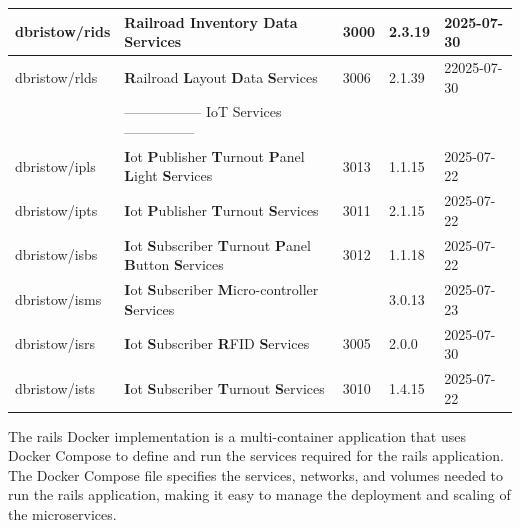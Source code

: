 \begin{longtable}{|L{3cm}|L{7cm}|L{1cm}|L{1.5cm}|L{2cm}|}
  dbristow/rids & \textbf{R}ailroad \textbf{I}nventory \textbf{D}ata \textbf{S}ervices  & 3000 & 2.3.19 & 2025-07-30 \\ \hline
  dbristow/rlds & \textbf{R}ailroad \textbf{L}ayout \textbf{D}ata \textbf{S}ervices  & 3006 & 2.1.39 & 22025-07-30 \\ \hline
  & ----------------- IoT Services --------------- &  &  & \\ \hline
  dbristow/ipls & \textbf{I}ot \textbf{P}ublisher \textbf{T}urnout \textbf{P}anel \textbf{L}ight \textbf{S}ervices & 3013 & 1.1.15 & 2025-07-22 \\ \hline
  dbristow/ipts & \textbf{I}ot \textbf{P}ublisher \textbf{T}urnout \textbf{S}ervices & 3011 & 2.1.15 & 2025-07-22 \\ \hline
  dbristow/isbs & \textbf{I}ot \textbf{S}ubscriber \textbf{T}urnout \textbf{P}anel \textbf{B}utton \textbf{S}ervices & 3012 & 1.1.18 & 2025-07-22 \\ \hline
  dbristow/isms & \textbf{I}ot \textbf{S}ubscriber \textbf{M}icro-controller \textbf{S}ervices &  & 3.0.13 & 2025-07-23 \\ \hline
  dbristow/isrs & \textbf{I}ot \textbf{S}ubscriber \textbf{R}FID \textbf{S}ervices & 3005 & 2.0.0 & 2025-07-30 \\ \hline
  dbristow/ists & \textbf{I}ot \textbf{S}ubscriber \textbf{T}urnout \textbf{S}ervices & 3010 & 1.4.15 & 2025-07-22 \\ \hline
    \end{longtable}
The \gls{rails} Docker implementation is a multi-container application that uses Docker Compose to define and run the services required for the \gls{rails} application. The Docker Compose file specifies the services, networks, and volumes needed to run the \gls{rails} application, making it easy to manage the deployment and scaling of the microservices.
